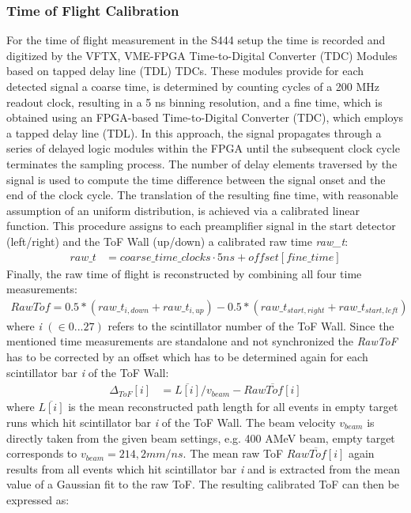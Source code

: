\subsubsection{Time of Flight Calibration}
For the time of flight measurement in the S444 setup the time is recorded and digitized by the VFTX,  VME-FPGA Time-to-Digital Converter (TDC) Modules based on tapped delay line (TDL) TDCs\cite{bayer2009development}. These modules provide for each detected signal a coarse time, is determined by counting cycles of a 200 MHz readout clock, resulting in a 5 ns binning resolution, and a fine time, which is obtained using an FPGA-based Time-to-Digital Converter (TDC), which employs a tapped delay line (TDL). In this approach, the signal propagates through a series of delayed logic modules within the FPGA until the subsequent clock cycle terminates the sampling process. The number of delay elements traversed by the signal is used to compute the time difference between the signal onset and the end of the clock cycle. The translation of the resulting fine time, with reasonable assumption of an uniform distribution, is achieved via a calibrated linear function. This procedure assigns to each preamplifier signal in the start detector (left/right) and the ToF Wall (up/down) a calibrated raw time \textit{raw\_t}:
\begin{align*}
raw\_t &= coarse\_time\_clocks  \cdot 5ns + offset[fine\_time]
\end{align*}
Finally, the raw time of flight is reconstructed by combining all four time measurements:
\begin{gather}
RawTof = 0.5*(raw\_t_{i,down}+raw\_t_{i,up}) - 0.5*(raw\_t_{start,right}+raw\_t_{start,left})
\end{gather}
where \textit{i} $(\in 0...27)$ refers to the scintillator number of the ToF Wall. Since the mentioned time measurements are standalone and not synchronized the \textit{RawToF} has to be corrected by an offset which has to be determined again for each scintillator bar \textit{i} of the ToF Wall:
\begin{align*}
\Delta_{ToF}[i] &= \overline{L[i]}/v_{beam} - \overline{RawTof[i]}
\end{align*} 
where $\overline{L[i]}$ is the mean reconstructed path length for all events in empty target runs which hit scintillator bar \textit{i} of the ToF Wall. The beam velocity $v_{beam}$ is directly taken from the given beam settings, e.g. 400 AMeV beam, empty target corresponds to $v_{beam} = 214,2mm/ns$. The mean raw ToF $\overline{RawTof[i]}$ again results from all events which hit scintillator bar \textit{i} and is extracted from the mean value of a Gaussian fit to the raw ToF. The resulting calibrated ToF can then be expressed as:
